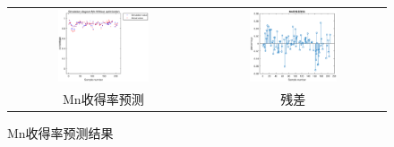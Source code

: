 \documentclass[12pt]{article}%
\begin{document}
\begin{figure}[htbp]
  \centering
  \begin{tabular}{cc}
  \includegraphics[width=0.5\textwidth]{picture/Mn_wuxiangduiwucha} & \includegraphics[width=0.5\textwidth]{picture/Mn_cancha} \\
    Mn收得率预测 & 残差 \\
  \end{tabular}
  \caption{Mn收得率预测结果}\label{fig:Mnyuce}
\end{figure}
\end{document}
